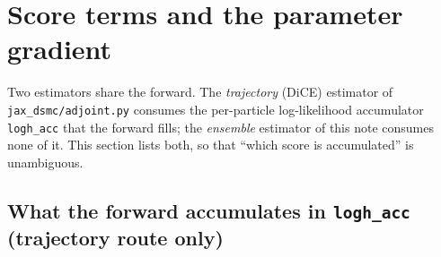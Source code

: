 \documentclass[11pt,a4paper]{article}
\numberwithin{equation}{section}
\newcommand{\code}[1]{\texttt{#1}}
\begin{document}
\section{Score terms and the parameter gradient}
\label{sec:scores}

Two estimators share the forward.  The \emph{trajectory} (DiCE) estimator of
\code{jax\_dsmc/adjoint.py} consumes the per-particle log-likelihood accumulator
\code{logh\_acc} that the forward fills; the \emph{ensemble} estimator of this note
consumes none of it.  This section lists both, so that ``which score is accumulated''
is unambiguous.

\subsection{What the forward accumulates in \code{logh\_acc} (trajectory route only)}
\label{sec:forward-scores}
\end{document}
